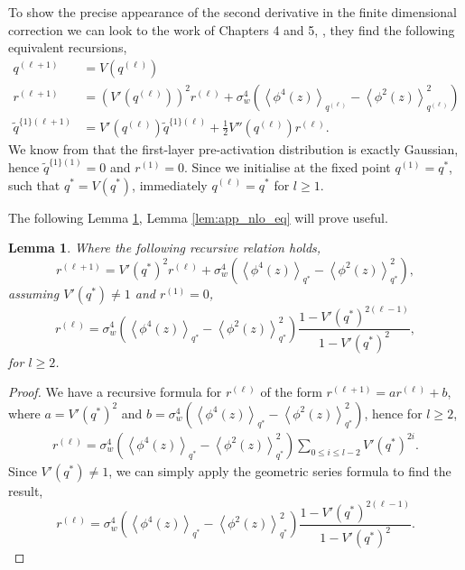 \documentclass{article}
\theoremstyle{plain}
\newtheorem{lemma}[theorem]{Lemma}
\theoremstyle{definition}
\theoremstyle{remark}
\begin{document}
To show the precise appearance of the second derivative in the finite dimensional correction we can look to the work of Chapters 4 and 5, \cite{roberts_principles_2022}, they find the following equivalent recursions,
\begin{align}
    q^{(\ell+1)} &= V\left(q^{(\ell)} \right) \label{eq:app_vmap}\\
    r^{(\ell+1)} &= \left(V' \left( q^{(\ell)}\right)\right)^2r^{(\ell)} + \sigma_w^4 \left( \left\langle \phi^4(z) \right\rangle_{q^{(\ell)}} - \left\langle \phi^2(z) \right\rangle^2_{q^{(\ell)}}\right) \label{eq:app_fourth_mom_recursion}\\
    \tilde{q}^{\{1\}(\ell+1)} &=  V' \left( q^{(\ell)}\right) \tilde{q}^{\{1\}(\ell)} + \frac{1}{2} V''\left( q^{(\ell)}\right) r^{(\ell)} \label{eq:app_nlo_recursion}.
\end{align}
We know from \cite{roberts_principles_2022} that the first-layer pre-activation distribution is exactly Gaussian, hence $\tilde{q}^{\{1\}(1)} =0$ and $ r^{(1)} =0$. Since we initialise at the fixed point $q^{(1)} = q^*$, such that $q^* =V \left( q^{*}\right)$, immediately $q^{(\ell)} = q^*$ for $l\geq 1$. 

The following Lemma \ref{lem:fourth_mom_eq}, Lemma \ref{lem:app_nlo_eq} will prove useful.

\begin{lemma}
\label{lem:fourth_mom_eq}
Where the following recursive relation holds, 
\begin{equation}
    r^{(\ell+1)} = V' \left( q^{*}\right)^2r^{(\ell)} + \sigma_w^4 \left( \left\langle \phi^4(z) \right\rangle_{q^{*}} - \left\langle \phi^2(z) \right\rangle^2_{q^{*}}\right),
\end{equation}
assuming $V'(q^*) \neq 1$ and $r^{(1)}=0$,
\begin{equation}
    r^{(\ell)} = \sigma_w^4 \left( \left\langle \phi^4(z) \right\rangle_{q^{*}} - \left\langle \phi^2(z) \right\rangle^2_{q^{*}}\right) \frac{1- V' \left( q^{*}\right)^{2(\ell-1)}}{1-V' \left( q^{*}\right)^{2}},
\end{equation}
for $l\geq2$.
\end{lemma}

\begin{proof}
    We have a recursive formula for $r^{(\ell)}$ of the form $r^{(\ell+1)} = ar^{(\ell)}+b$, where $a = V' \left( q^{*}\right)^2$ and $b= \sigma_w^4 \left( \left\langle \phi^4(z) \right\rangle_{q^{*}} - \left\langle \phi^2(z) \right\rangle^2_{q^{*}}\right)$, hence for $l\geq2$,
\begin{align}
    r^{(\ell)} = \sigma_w^4 \left( \left\langle \phi^4(z) \right\rangle_{q^{*}} - \left\langle \phi^2(z) \right\rangle^2_{q^{*}}\right) \sum_{0\leq i \leq l-2}  V' \left( q^{*}\right)^{2i}.
\end{align}
Since $V'(q^*)\neq 1$, we can simply apply the geometric series formula to find the result,
\begin{equation}
    r^{(\ell)} = \sigma_w^4 \left( \left\langle \phi^4(z) \right\rangle_{q^{*}} - \left\langle \phi^2(z) \right\rangle^2_{q^{*}}\right) \frac{1- V' \left( q^{*}\right)^{2(\ell-1)}}{1-V' \left( q^{*}\right)^{2}}.
\end{equation}
\end{proof}
\end{document}
